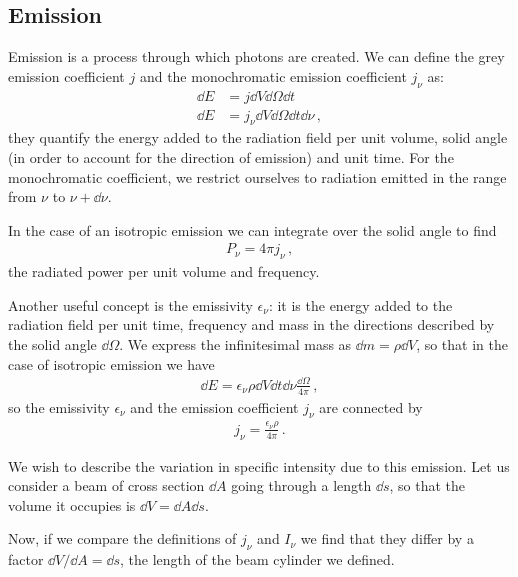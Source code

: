 \documentclass[main.tex]{subfiles}
\begin{document}
\subsection{Emission}

Emission is a process through which photons are created. 
We can define the grey emission coefficient \(j\) and the monochromatic emission coefficient \(j_{\nu }\) as: 
%
\begin{subequations}
\begin{align}
\dd{E} &= j \dd{V} \dd{\Omega } \dd{t}  \\
\dd{E} &= j_{\nu } \dd{V} \dd{\Omega } \dd{t} \dd{\nu }
\,,
\end{align}
\end{subequations}
%
they quantify the energy added to the radiation field per unit volume, solid angle (in order to account for the direction of emission) and unit time. For the monochromatic coefficient, we restrict ourselves to radiation emitted in the range from \(\nu \) to \(\nu + \dd{\nu }\).

In the case of an isotropic emission we can integrate over the solid angle to find  
%
\begin{align}
P_{\nu } = 4 \pi j_{\nu }
\,,
\end{align}
%
the radiated power per unit volume and frequency. 

Another useful concept is the emissivity \(\epsilon_{\nu }\): it is the energy added to the radiation field per unit time, frequency and mass in the directions described by the solid angle \(\dd{\Omega }\).
We express the infinitesimal mass as \(\dd{m} = \rho \dd{V}\), so that in the case of isotropic emission we have
%
\begin{align}
\dd{E} = \epsilon_{\nu } \rho \dd{V} \dd{t} \dd{\nu } \frac{ \dd{\Omega }}{4\pi }
\,,
\end{align}
%
so the emissivity \(\epsilon_{\nu }\) and the emission coefficient \(j_{\nu }\) are connected by 
%
\begin{align}
j_{\nu } = \frac{\epsilon_{\nu } \rho }{4 \pi }
\,.
\end{align}

We wish to describe the variation in specific intensity due to this emission. 
Let us consider a beam of cross section \(\dd{A}\) going through a length \(\dd{s}\), so that the volume it occupies is \(\dd{V} = \dd{A} \dd{s}\). 

Now, if we compare the definitions of \(j_{\nu }\) and \(I_{\nu }\) we find that they differ by a factor \(\dd{V} / \dd{A} = \dd{s}\), the length of the beam cylinder we defined. 
\end{document}
